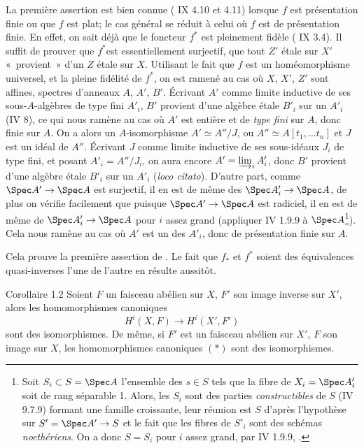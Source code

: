 \documentclass[10pt]{../fichiers-configuration-latex/smfart}
\begin{document}
La première assertion est bien connue (\SGA{} IX 4.10 et 4.11) lorsque
$f$ est présentation finie ou que $f$ est plat; le cas général se
réduit à celui où $f$ est de présentation  finie. En effet, on sait
déjà que le foncteur $f^{\ast}$ est pleinement fidèle ( IX
3.4). Il suffit de prouver que $f^{\ast}$\pageoriginale  est
essentiellement surjectif, \ie que tout $Z'$ étale sur $X'$ « provient » d'un $Z$ étale sur $X$. Utilisant le fait que $f$ est
un homéomorphisme universel, et la pleine fidélité de $f^{\ast}$, on
est ramené au cas où $X$, $X'$, $Z'$ sont affines, spectres
d'anneaux $A$, $A'$, $B'$. Écrivant $A'$ comme limite inductive de
ses sous-$A$-algèbres de type fini $A'_{i}$, $B'$ provient d'une
algèbre étale $B'_{i}$ sur un $A'_{i}$ (\cf \EGA IV 8), ce qui nous
ramène au cas où $A'$ est entière et de \emph{type fini} sur $A$,
donc finie sur $A$. On a alors un $A$-isomorphisme $A'\simeq A''/J$,
ou $A'' \simeq A [t_1, \ldots t_n]$ et $J$ est un idéal de $A''$.
Écrivant $J$ comme limite inductive de ses sous-idéaux $J_i$ de type
fini, et posant $A'_i = A'' /J_i$, on aura encore $A' = \varinjlim_i
A'_{i}$, donc $B'$ provient d'une algèbre étale $B'_i$ sur un $A'_i$
(\emph{loco citato}). D'autre part, comme $\Spec A'\to \Spec A$ est
surjectif, il en est de même des $\Spec A'_i \to \Spec A$, de plus
on vérifie facilement que puisque $\Spec A'\to \Spec A$ est
radiciel, il en est de même de $\Spec A'_i \to \Spec A$ pour $i$
assez grand (appliquer \EGA IV 1.9.9 à $\Spec A$\footnote{Soit $S_i
\subset S =
  \Spec A$ l'ensemble des $s \in S$ tels que la fibre de $X_i = \Spec
  A'_i$  soit de rang séparable 1. Alors, les $S_i$ sont des
  parties \emph{constructibles} de $S$ (\EGA IV 9.7.9) formant une
  famille croissante, leur réunion est $S$ d'après l'hypothèse sur $S'=
  \Spec A'\to S$ et le fait que les fibres de $S'_i$ sont des
  schémas \emph{noethériens}. On a donc $S = S_i$ pour $i$ assez
  grand, par \EGA IV 1.9.9, \cqfd.}). Cela nous ramène au cas où $A'$
est un des $A'_i$, donc de présentation finie sur $A$.

Cela prouve la première assertion de .
Le fait que $f_{\ast}$ et
$f^{\ast}$ soient des équivalences quasi-inverses l'une de l'autre en
résulte aussitôt.

\begin{enonce*}{Corollaire 1.2}
Soient $F$ un faisceau abélien sur $X$, $F'$ son image inverse sur
$X'$, alors les homomorphismes canoniques
\begin{equation*}
H^{i} (X, F) \to H^{i} (X', F')\tag{$\ast$}
\end{equation*}
sont des isomorphismes. De même, si $F'$ est un faisceau abélien sur
$X'$, $F$ son image sur $X$, les homomorphismes canoniques $(\ast)$
sont des isomorphismes.
\end{enonce*}
\end{document}
